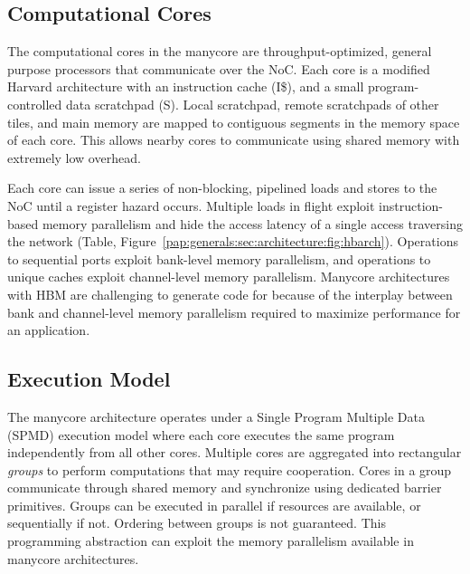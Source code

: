 \subsection{Computational Cores}
The computational cores in
the manycore are
throughput-optimized, general purpose processors that communicate  over the NoC.
Each core is a modified Harvard architecture with an
instruction cache (I\$), and a small program-controlled data scratchpad
(S). Local scratchpad, remote scratchpads of other tiles, and main
memory are mapped to contiguous segments in the memory
space of each core. This allows nearby cores to communicate
using shared memory with extremely low overhead. 

Each core can issue a series of non-blocking, pipelined loads and stores to the NoC until a register hazard occurs. Multiple loads in flight exploit
instruction-based memory parallelism and hide the access latency of a
single access traversing the network (Table,
Figure~\ref{pap:generals:sec:architecture:fig:hbarch}). Operations
to sequential ports exploit bank-level memory parallelism, and
operations to unique caches exploit channel-level memory
parallelism. 
Manycore architectures with HBM are challenging to generate code for because of the interplay between bank and channel-level memory parallelism required to maximize performance for an application.


\subsection{Execution Model}
The manycore architecture operates under a Single Program Multiple
Data (SPMD) execution model where each core executes the same program
independently from all other cores. Multiple cores are aggregated into
rectangular \textit{groups} to perform computations that may require
cooperation. Cores in a group communicate through shared memory and
synchronize using dedicated barrier primitives. Groups can be executed
in parallel if resources are available, or sequentially if not. Ordering
between groups is not guaranteed. This programming abstraction can 
exploit the memory parallelism available in manycore architectures.

